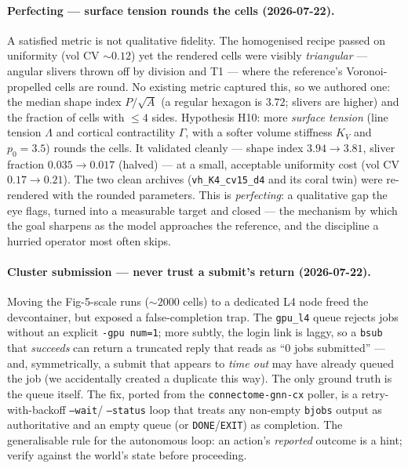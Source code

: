 \documentclass[11pt]{article}
\begin{document}
\paragraph{Perfecting --- surface tension rounds the cells (2026-07-22).} A satisfied metric is not
qualitative fidelity. The homogenised recipe passed on uniformity (vol CV $\sim0.12$) yet the rendered
cells were visibly \emph{triangular} --- angular slivers thrown off by division and T1 --- where the
reference's Voronoi-propelled cells are round. No existing metric captured this, so we authored one: the
median shape index $P/\sqrt{A}$ (a regular hexagon is $3.72$; slivers are higher) and the fraction of
cells with $\le4$ sides. Hypothesis H10: more \emph{surface tension} (line tension $\Lambda$ and cortical
contractility $\Gamma$, with a softer volume stiffness $K_V$ and $p_0\!=\!3.5$) rounds the cells. It
validated cleanly --- shape index $3.94\!\to\!3.81$, sliver fraction $0.035\!\to\!0.017$ (halved) --- at
a small, acceptable uniformity cost (vol CV $0.17\!\to\!0.21$). The two clean archives
(\texttt{vh\_K4\_cv15\_d4} and its coral twin) were re-rendered with the rounded parameters. This is
\emph{perfecting}: a qualitative gap the eye flags, turned into a measurable target and closed --- the
mechanism by which the goal sharpens as the model approaches the reference, and the discipline a hurried
operator most often skips.

\paragraph{Cluster submission --- never trust a submit's return (2026-07-22).} Moving the Fig-5-scale
runs ($\sim2000$ cells) to a dedicated L4 node freed the devcontainer, but exposed a false-completion
trap. The \texttt{gpu\_l4} queue rejects jobs without an explicit \texttt{-gpu num=1}; more subtly, the
login link is laggy, so a \texttt{bsub} that \emph{succeeds} can return a truncated reply that reads as
``$0$ jobs submitted'' --- and, symmetrically, a submit that appears to \emph{time out} may have already
queued the job (we accidentally created a duplicate this way). The only ground truth is the queue itself.
The fix, ported from the \texttt{connectome-gnn-cx} poller, is a retry-with-backoff \texttt{--wait}/%
\texttt{--status} loop that treats any non-empty \texttt{bjobs} output as authoritative and an empty
queue (or \texttt{DONE}/\texttt{EXIT}) as completion. The generalisable rule for the autonomous loop: an
action's \emph{reported} outcome is a hint; verify against the world's state before proceeding.
\end{document}
